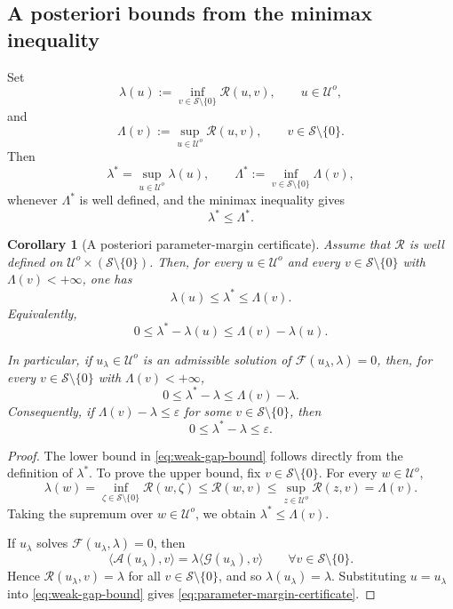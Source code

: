 \documentclass[preprint,10pt]{elsarticle}
\numberwithin{equation}{section}
\newtheorem{cor}[thm]{Corollary}
\begin{document}
\subsection{A posteriori bounds from the minimax inequality}

Set
\[
\lambda(u):=
\inf_{v\in\mathcal S\setminus\{0\}}\mathcal R(u,v),
\qquad
u\in\mathcal U^o,
\]
and
\[
\Lambda(v):=
\sup_{u\in\mathcal U^o}\mathcal R(u,v),
\qquad
v\in\mathcal S\setminus\{0\}.
\]
Then
\[
\lambda^*
=
\sup_{u\in\mathcal U^o}\lambda(u),
\qquad
\Lambda^*
:=
\inf_{v\in\mathcal S\setminus\{0\}}\Lambda(v),
\]
whenever \(\Lambda^*\) is well defined, and the minimax inequality gives
\[
\lambda^*\le \Lambda^* .
\]

\begin{cor}[A posteriori parameter-margin certificate]
	\label{cor:parameter-margin}
	Assume that \(\mathcal R\) is well defined on
	\(\mathcal U^o\times(\mathcal S\setminus\{0\})\). Then, for every
	\(u\in\mathcal U^o\) and every \(v\in\mathcal S\setminus\{0\}\) with
	\(\Lambda(v)<+\infty\), one has
	\begin{equation}\label{eq:weak-gap-bound}
		\lambda(u)\le \lambda^*\le \Lambda(v).
	\end{equation}
	Equivalently,
	\[
	0\le \lambda^*-\lambda(u)\le \Lambda(v)-\lambda(u).
	\]
	
	In particular, if \(u_\lambda\in\mathcal U^o\) is an admissible solution of
	\(\mathcal F(u_\lambda,\lambda)=0\), then, for every
	\(v\in\mathcal S\setminus\{0\}\) with \(\Lambda(v)<+\infty\),
	\begin{equation}\label{eq:parameter-margin-certificate}
		0\le \lambda^*-\lambda\le \Lambda(v)-\lambda .
	\end{equation}
	Consequently, if \(\Lambda(v)-\lambda\le\varepsilon\) for some
	\(v\in\mathcal S\setminus\{0\}\), then
	\[
	0\le \lambda^*-\lambda\le\varepsilon .
	\]
\end{cor}

\begin{proof}
	The lower bound in \eqref{eq:weak-gap-bound} follows directly from the
	definition of \(\lambda^*\). To prove the upper bound, fix
	\(v\in\mathcal S\setminus\{0\}\). For every \(w\in\mathcal U^o\),
	\[
	\lambda(w)
	=
	\inf_{\zeta\in\mathcal S\setminus\{0\}}\mathcal R(w,\zeta)
	\le
	\mathcal R(w,v)
	\le
	\sup_{z\in\mathcal U^o}\mathcal R(z,v)
	=
	\Lambda(v).
	\]
	Taking the supremum over \(w\in\mathcal U^o\), we obtain
	\(\lambda^*\le\Lambda(v)\).
	
	If \(u_\lambda\) solves \(\mathcal F(u_\lambda,\lambda)=0\), then
	\[
	\langle \mathcal A(u_\lambda),v\rangle
	=
	\lambda\langle\mathcal G(u_\lambda),v\rangle
	\qquad
	\forall v\in\mathcal S\setminus\{0\}.
	\]
	Hence \(\mathcal R(u_\lambda,v)=\lambda\) for all
	\(v\in\mathcal S\setminus\{0\}\), and so
	\(\lambda(u_\lambda)=\lambda\). Substituting
	\(u=u_\lambda\) into \eqref{eq:weak-gap-bound} gives
	\eqref{eq:parameter-margin-certificate}.
\end{proof}
\end{document}
